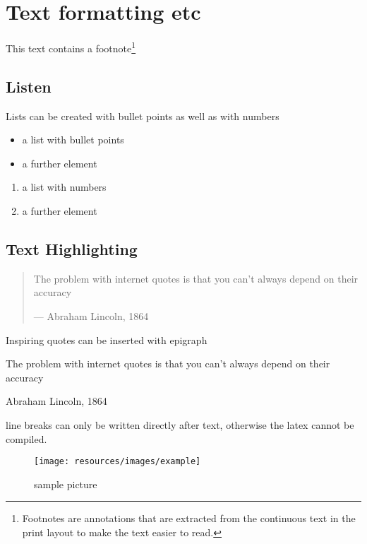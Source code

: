 \section{Text formatting etc}
This text contains a footnote\footnote{Footnotes are annotations that are extracted from the continuous text in the print layout to make the text easier to read.}

\subsection{Listen}
Lists can be created with bullet points as well as with numbers
\begin{itemize}
	\item a list with bullet points
	\item a further element
\end{itemize}

\begin{enumerate}
	\item a list with numbers
	\item a further element
\end{enumerate}

\subsection{Text Highlighting}
\begin{quote}
	The problem with internet quotes is that you can't always depend on their accuracy \par\raggedleft--- \textup{Abraham Lincoln, 1864}
\end{quote}

Inspiring quotes can be inserted with epigraph

\epigraph{The problem with internet quotes is that you can't always depend on their accuracy}{Abraham Lincoln, 1864}

line breaks can only be written directly after text, otherwise the latex cannot be compiled.
\\ %


\begin{figure}[H]
	\centering
	\texttt{[image: resources/images/example]}
	\caption{sample picture {\cite{PEXELS2015}}}
	\label{img:examplePicture}
\end{figure}

